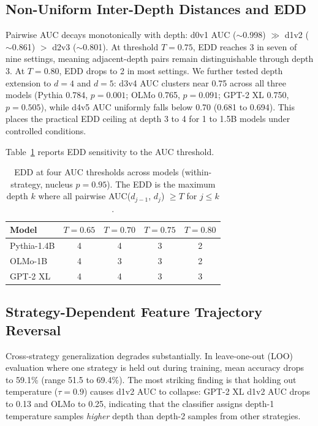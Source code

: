 \documentclass[11pt,a4paper]{article}
\begin{document}
\subsection{Non-Uniform Inter-Depth Distances and EDD}
\label{sec:edd_analysis}

Pairwise AUC decays monotonically with depth: d0v1 AUC ($\sim$0.998) $\gg$ d1v2 ($\sim$0.861) $>$ d2v3 ($\sim$0.801).
At threshold $T{=}0.75$, EDD reaches 3 in seven of nine settings, meaning adjacent-depth pairs remain distinguishable through depth 3.
At $T{=}0.80$, EDD drops to 2 in most settings.
We further tested depth extension to $d{=}4$ and $d{=}5$: d3v4 AUC clusters near 0.75 across all three models (Pythia 0.784, $p{=}0.001$; OLMo 0.765, $p{=}0.091$; GPT-2 XL 0.750, $p{=}0.505$), while d4v5 AUC uniformly falls below 0.70 (0.681 to 0.694).
This places the practical EDD ceiling at depth 3 to 4 for 1 to 1.5B models under controlled conditions.

Table~\ref{tab:edd_sensitivity} reports EDD sensitivity to the AUC threshold.

\begin{table}[t]
\centering
\caption{EDD at four AUC thresholds across models (within-strategy, nucleus $p{=}0.95$). The EDD is the maximum depth $k$ where all pairwise AUC($d_{j-1}$, $d_j$) $\geq T$ for $j \leq k$.}
\label{tab:edd_sensitivity}
\small
\begin{tabular}{lcccc}
\toprule
Model & $T{=}0.65$ & $T{=}0.70$ & $T{=}0.75$ & $T{=}0.80$ \\
\midrule
Pythia-1.4B  & 4 & 4 & 3 & 2 \\
OLMo-1B     & 4 & 3 & 3 & 2 \\
GPT-2 XL    & 4 & 4 & 3 & 3 \\
\bottomrule
\end{tabular}
\end{table}

\subsection{Strategy-Dependent Feature Trajectory Reversal}
\label{sec:strategy_reversal}

Cross-strategy generalization degrades substantially.
In leave-one-out (LOO) evaluation where one strategy is held out during training, mean accuracy drops to 59.1\% (range 51.5 to 69.4\%).
The most striking finding is that holding out temperature ($\tau{=}0.9$) causes d1v2 AUC to collapse: GPT-2 XL d1v2 AUC drops to 0.13 and OLMo to 0.25, indicating that the classifier assigns depth-1 temperature samples \emph{higher} depth than depth-2 samples from other strategies.
\end{document}

